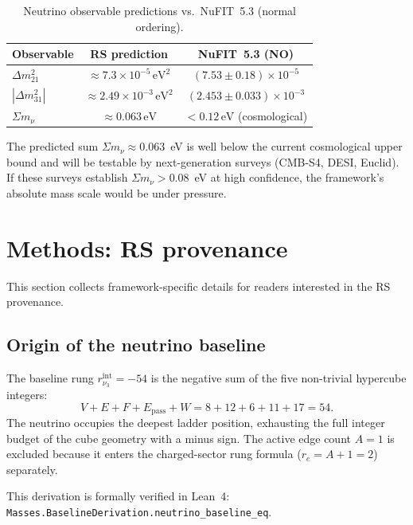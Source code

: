 \documentclass[11pt]{article}
\theoremstyle{remark}
\newcommand{\Epass}{E_{\mathrm{pass}}}
\begin{document}
\begin{table}[h]
\centering
\caption{Neutrino observable predictions vs.\ NuFIT~5.3
(normal ordering).}
\label{tab:observables}
\begin{tabular}{lcc}
\toprule
Observable & RS prediction & NuFIT~5.3 (NO) \\
\midrule
$\Delta m^2_{21}$ &
  $\approx 7.3\times 10^{-5}\,\mathrm{eV}^2$ &
  $(7.53\pm 0.18)\times 10^{-5}$ \\
$|\Delta m^2_{31}|$ &
  $\approx 2.49\times 10^{-3}\,\mathrm{eV}^2$ &
  $(2.453\pm 0.033)\times 10^{-3}$ \\
$\Sigma m_\nu$ &
  $\approx 0.063\,\mathrm{eV}$ &
  $< 0.12\,\mathrm{eV}$ (cosmological) \\
\bottomrule
\end{tabular}
\end{table}

The predicted sum $\Sigma m_\nu\approx 0.063$~eV is well below
the current cosmological upper bound and will be testable by
next-generation surveys (CMB-S4, DESI, Euclid).  If these
surveys establish $\Sigma m_\nu > 0.08$~eV at high confidence,
the framework's absolute mass scale would be under pressure.

\section{Methods: RS provenance}
\label{sec:methods}

This section collects framework-specific details for readers
interested in the RS provenance.

\subsection{Origin of the neutrino baseline}

The baseline rung $r_{\nu_3}^{\mathrm{int}}=-54$ is the
negative sum of the five non-trivial hypercube integers:
\[
  V+E+F+\Epass+W = 8+12+6+11+17 = 54.
\]
The neutrino occupies the deepest ladder position, exhausting
the full integer budget of the cube geometry with a minus sign.
The active edge count $A=1$ is excluded because it enters the
charged-sector rung formula ($r_e=A+1=2$) separately.

This derivation is formally verified in Lean~4:
\texttt{Masses.BaselineDerivation.neutrino\_baseline\_eq}.
\end{document}
